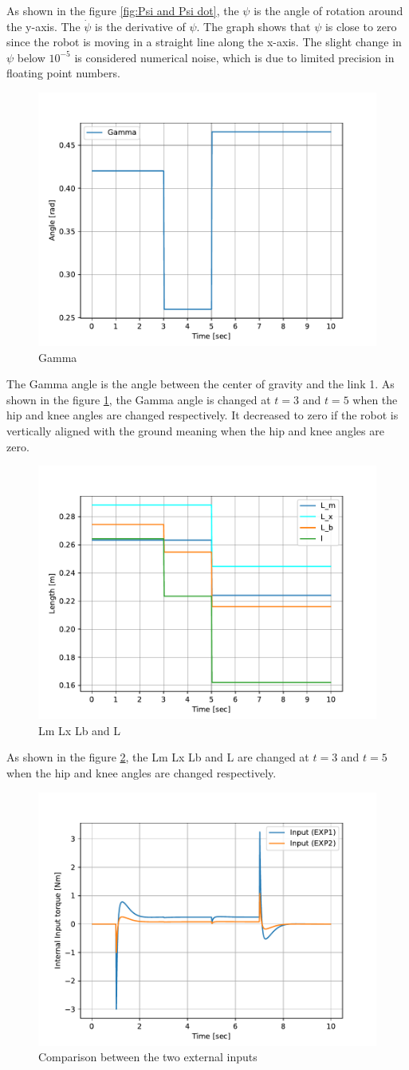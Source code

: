 As shown in the figure \ref{fig:Psi and Psi dot}, the $\psi$ is the angle of rotation around the y-axis. The $\dot{\psi}$ is the derivative of $\psi$. The graph shows that $\psi$ is close to zero since the robot is moving in a straight line along the x-axis. The slight change in $\psi$ below $10^{-5}$ is considered numerical noise, which is due to limited precision in floating point numbers.
\begin{figure}[h]
	\centering
	\includegraphics[width=.5\textwidth]{Gamma}
	\caption{Gamma}
	\label{fig:Gamma}
\end{figure}

The Gamma angle is the angle between the center of gravity and the link 1. As shown in the figure \ref{fig:Gamma}, the Gamma angle is changed at $t=3$ and $t=5$ when the hip and knee angles are changed respectively. It decreased to zero if the robot is vertically aligned with the ground meaning when the hip and knee angles are zero.
\begin{figure}[h]
	\centering
	\includegraphics[width=.5\textwidth]{L_m L_x L_b L}
	\caption{Lm Lx Lb and L}
	\label{fig:Lm Lx Lb and L}
\end{figure}
\newpage
As shown in the figure \ref{fig:Lm Lx Lb and L}, the Lm Lx Lb and L are changed at $t=3$ and $t=5$ when the hip and knee angles are changed respectively.
\begin{figure}[h]
	\centering
	\includegraphics[width=.5\textwidth]{Comparison between the two external inputs}
	\caption{Comparison between the two external inputs}
	\label{fig:Comparison between the two external inputs}
\end{figure}

